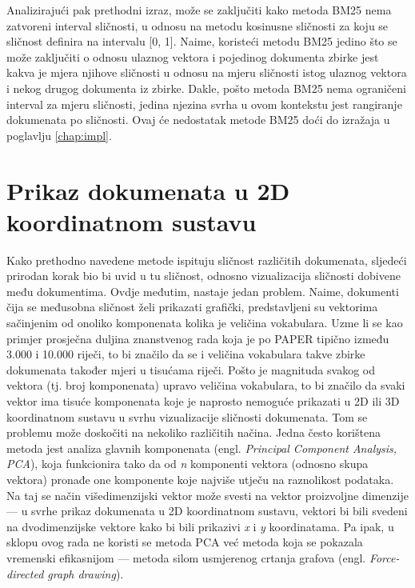 \documentclass[times, utf8, zavrsni]{fer}
\begin{document}
Analizirajući pak prethodni izraz, može se zaključiti kako metoda BM25 nema zatvoreni interval sličnosti, u odnosu na metodu kosinusne sličnosti za koju se sličnost definira na intervalu [0, 1]. Naime, koristeći metodu BM25 jedino što se može zaključiti o odnosu ulaznog vektora i pojedinog dokumenta zbirke jest kakva je mjera njihove sličnosti u odnosu na mjeru sličnosti istog ulaznog vektora i nekog drugog dokumenta iz zbirke. Dakle, pošto metoda BM25 nema ograničeni interval za mjeru sličnosti, jedina njezina svrha u ovom kontekstu jest rangiranje dokumenata po sličnosti. Ovaj će nedostatak metode BM25 doći do izražaja u poglavlju \ref{chap:impl}.

\chapter{Prikaz dokumenata u 2D koordinatnom sustavu}
\label{chap:docsin2d}
Kako prethodno navedene metode ispituju sličnost različitih dokumenata, sljedeći prirodan korak bio bi uvid u tu sličnost, odnosno vizualizacija  sličnosti dobivene među dokumentima. Ovdje međutim, nastaje jedan problem. Naime, dokumenti čija se međusobna sličnost želi prikazati grafički, predstavljeni su vektorima sačinjenim od onoliko komponenata kolika je veličina vokabulara. Uzme li se kao primjer prosječna duljina znanstvenog rada koja je po PAPER tipično između 3.000 i 10.000 riječi, to bi značilo da se i veličina vokabulara takve zbirke dokumenata također mjeri u tisućama riječi. Pošto je magnituda svakog od vektora (tj. broj komponenata) upravo veličina vokabulara, to bi značilo da svaki vektor ima tisuće komponenata koje je naprosto nemoguće prikazati u 2D ili 3D koordinatnom sustavu u svrhu vizualizacije sličnosti dokumenata. Tom se problemu može doskočiti na nekoliko različitih načina. Jedna često korištena metoda jest analiza glavnih komponenata (engl. \textit{Principal Component Analysis, PCA}), koja funkcionira tako da od \textit{n} komponenti vektora (odnosno skupa vektora) pronađe one komponente koje najviše utječu na raznolikost podataka. Na taj se način višedimenzijski vektor može svesti na vektor proizvoljne dimenzije — u svrhe prikaz dokumenata u 2D koordinatnom sustavu, vektori bi bili svedeni na dvodimenzijske vektore kako bi bili prikazivi \textit{x} i \textit{y} koordinatama. Pa ipak, u sklopu ovog rada ne koristi se metoda PCA već metoda koja se pokazala vremenski efikasnijom — metoda silom usmjerenog crtanja grafova (engl. \textit{Force-directed graph drawing}).
\end{document}
